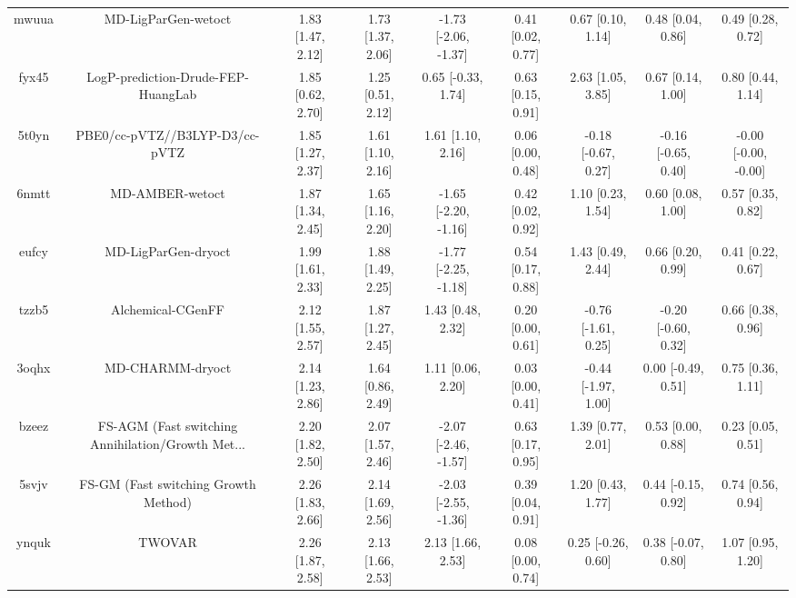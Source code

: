 \documentclass{article}
\begin{document}
\begin{center}
\begin{longtable}{|ccccccccc|}
 mwuua &                                MD-LigParGen-wetoct &  1.83 [1.47, 2.12] &  1.73 [1.37, 2.06] &  -1.73 [-2.06, -1.37] &  0.41 [0.02, 0.77] &    0.67 [0.10, 1.14] &    0.48 [0.04, 0.86] &     0.49 [0.28, 0.72] \\
 fyx45 &                 LogP-prediction-Drude-FEP-HuangLab &  1.85 [0.62, 2.70] &  1.25 [0.51, 2.12] &    0.65 [-0.33, 1.74] &  0.63 [0.15, 0.91] &    2.63 [1.05, 3.85] &    0.67 [0.14, 1.00] &     0.80 [0.44, 1.14] \\
 5t0yn &                     PBE0/cc-pVTZ//B3LYP-D3/cc-pVTZ &  1.85 [1.27, 2.37] &  1.61 [1.10, 2.16] &     1.61 [1.10, 2.16] &  0.06 [0.00, 0.48] &  -0.18 [-0.67, 0.27] &  -0.16 [-0.65, 0.40] &  -0.00 [-0.00, -0.00] \\
 6nmtt &                                    MD-AMBER-wetoct &  1.87 [1.34, 2.45] &  1.65 [1.16, 2.20] &  -1.65 [-2.20, -1.16] &  0.42 [0.02, 0.92] &    1.10 [0.23, 1.54] &    0.60 [0.08, 1.00] &     0.57 [0.35, 0.82] \\
 eufcy &                                MD-LigParGen-dryoct &  1.99 [1.61, 2.33] &  1.88 [1.49, 2.25] &  -1.77 [-2.25, -1.18] &  0.54 [0.17, 0.88] &    1.43 [0.49, 2.44] &    0.66 [0.20, 0.99] &     0.41 [0.22, 0.67] \\
 tzzb5 &                                  Alchemical-CGenFF &  2.12 [1.55, 2.57] &  1.87 [1.27, 2.45] &     1.43 [0.48, 2.32] &  0.20 [0.00, 0.61] &  -0.76 [-1.61, 0.25] &  -0.20 [-0.60, 0.32] &     0.66 [0.38, 0.96] \\
 3oqhx &                                   MD-CHARMM-dryoct &  2.14 [1.23, 2.86] &  1.64 [0.86, 2.49] &     1.11 [0.06, 2.20] &  0.03 [0.00, 0.41] &  -0.44 [-1.97, 1.00] &   0.00 [-0.49, 0.51] &     0.75 [0.36, 1.11] \\
 bzeez &  FS-AGM (Fast switching Annihilation/Growth Met... &  2.20 [1.82, 2.50] &  2.07 [1.57, 2.46] &  -2.07 [-2.46, -1.57] &  0.63 [0.17, 0.95] &    1.39 [0.77, 2.01] &    0.53 [0.00, 0.88] &     0.23 [0.05, 0.51] \\
 5svjv &               FS-GM (Fast switching Growth Method) &  2.26 [1.83, 2.66] &  2.14 [1.69, 2.56] &  -2.03 [-2.55, -1.36] &  0.39 [0.04, 0.91] &    1.20 [0.43, 1.77] &   0.44 [-0.15, 0.92] &     0.74 [0.56, 0.94] \\
 ynquk &                                             TWOVAR &  2.26 [1.87, 2.58] &  2.13 [1.66, 2.53] &     2.13 [1.66, 2.53] &  0.08 [0.00, 0.74] &   0.25 [-0.26, 0.60] &   0.38 [-0.07, 0.80] &     1.07 [0.95, 1.20] \\

\end{longtable}
\end{center}
\end{document}
